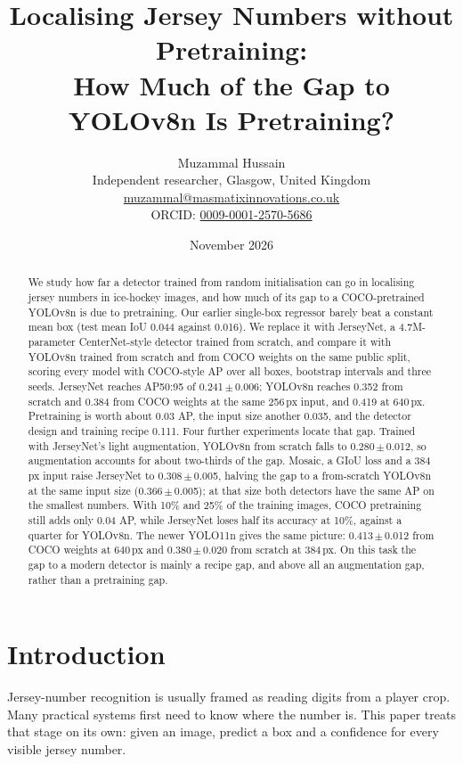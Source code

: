 \documentclass[10pt,a4paper]{article}
\title{Localising Jersey Numbers without Pretraining:\\How Much of the Gap to YOLOv8n Is Pretraining?}
\author{Muzammal Hussain\\
\small Independent researcher, Glasgow, United Kingdom\\
\small \href{mailto:muzammal@masmatixinnovations.co.uk}{muzammal@masmatixinnovations.co.uk}\\
\small ORCID: \href{https://orcid.org/0009-0001-2570-5686}{0009-0001-2570-5686}}
\date{\small November 2026}
\newcommand{\pmv}[2]{#1\,$\pm$\,#2}
\begin{document}
\maketitle

\begin{abstract}
We study how far a detector trained from random initialisation can go in localising jersey
numbers in ice-hockey images, and how much of its gap to a COCO-pretrained YOLOv8n is due to
pretraining. Our earlier single-box regressor barely beat a constant mean box (test mean IoU
0.044 against 0.016). We replace it with JerseyNet, a 4.7M-parameter CenterNet-style detector
trained from scratch, and compare it with YOLOv8n trained from scratch and from COCO weights on
the same public split, scoring every model with COCO-style AP over all boxes, bootstrap intervals
and three seeds. JerseyNet reaches AP50:95 of \pmv{0.241}{0.006}; YOLOv8n reaches 0.352 from
scratch and 0.384 from COCO weights at the same 256\,px input, and 0.419 at 640\,px. Pretraining
is worth about 0.03 AP, the input size another 0.035, and the detector design and training recipe
0.111. Four further experiments locate that gap. Trained with JerseyNet's light augmentation,
YOLOv8n from scratch falls to \pmv{0.280}{0.012}, so augmentation accounts for about two-thirds
of the gap. Mosaic, a GIoU loss and a 384\,px input raise JerseyNet to \pmv{0.308}{0.005}, halving
the gap to a from-scratch YOLOv8n at the same input size (\pmv{0.366}{0.005}); at that size both
detectors have the same AP on the smallest numbers. With 10\% and 25\% of the training images,
COCO pretraining still adds only 0.04 AP, while JerseyNet loses half its accuracy at 10\%, against
a quarter for YOLOv8n. The newer YOLO11n gives the same picture: \pmv{0.413}{0.012} from COCO
weights at 640\,px and \pmv{0.380}{0.020} from scratch at 384\,px. On this task the gap to a modern
detector is mainly a recipe gap, and above all an augmentation gap, rather than a pretraining gap.
\end{abstract}

\section{Introduction}

Jersey-number recognition is usually framed as reading digits from a player crop. Many practical
systems first need to know where the number is. This paper treats that stage on its own: given an
image, predict a box and a confidence for every visible jersey number.
\end{document}
